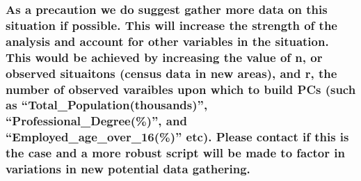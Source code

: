 \documentclass[]{article}
\begin{document}
\hypertarget{as-a-precaution-we-do-suggest-gather-more-data-on-this-situation-if-possible.-this-will-increase-the-strength-of-the-analysis-and-account-for-other-variables-in-the-situation.-this-would-be-achieved-by-increasing-the-value-of-n-or-observed-situaitons-census-data-in-new-areas-and-r-the-number-of-observed-varaibles-upon-which-to-build-pcs-such-as-total_populationthousands-professional_degree-and-employed_age_over_16-etc.-please-contact-if-this-is-the-case-and-a-more-robust-script-will-be-made-to-factor-in-variations-in-new-potential-data-gathering.}{%
\subsubsection{As a precaution we do suggest gather more data on this
situation if possible. This will increase the strength of the analysis
and account for other variables in the situation. This would be achieved
by increasing the value of n, or observed situaitons (census data in new
areas), and r, the number of observed varaibles upon which to build PCs
(such as ``Total\_Population(thousands)'', ``Professional\_Degree(\%)'',
and ``Employed\_age\_over\_16(\%)'' etc). Please contact if this is the
case and a more robust script will be made to factor in variations in
new potential data
gathering.}\label{as-a-precaution-we-do-suggest-gather-more-data-on-this-situation-if-possible.-this-will-increase-the-strength-of-the-analysis-and-account-for-other-variables-in-the-situation.-this-would-be-achieved-by-increasing-the-value-of-n-or-observed-situaitons-census-data-in-new-areas-and-r-the-number-of-observed-varaibles-upon-which-to-build-pcs-such-as-total_populationthousands-professional_degree-and-employed_age_over_16-etc.-please-contact-if-this-is-the-case-and-a-more-robust-script-will-be-made-to-factor-in-variations-in-new-potential-data-gathering.}}
\end{document}
